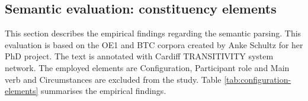 \subsection{Semantic evaluation: constituency elements}
\label{sec:semantic-constituents}
This section describes the empirical findings regarding the semantic parsing. This evaluation is based on the OE1 and BTC corpora created by Anke Schultz for her PhD project. The text is annotated with Cardiff TRANSITIVITY system network. The employed elements are Configuration, Participant role and Main verb and Circumstances are excluded from the study. Table \ref{tab:configuration-elements} summarises the empirical findings. 

\begin{table}[!ht]
    \caption{The evaluation statistics for the main semantic elements}
    \label{tab:configuration-elements}
\end{table}
